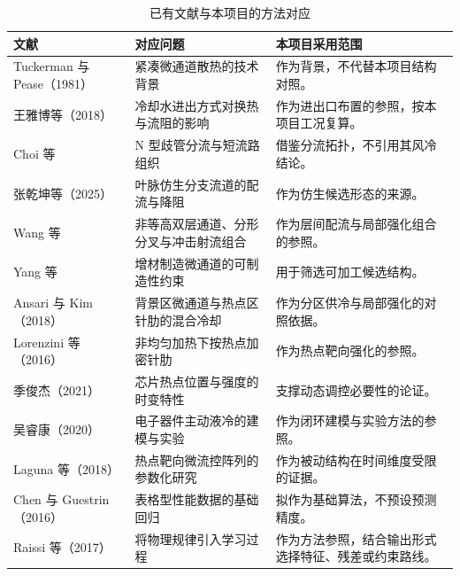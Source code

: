 \documentclass[UTF8]{midterm}
\begin{document}
\clearpage
\setcounter{section}{2}
\setcounter{table}{0}
\begin{table}[!htbp]\centering\small
\caption{已有文献与本项目的方法对应}\label{tab:reading}
\begin{tabularx}{\linewidth}{@{}Y Y Y@{}}\toprule
{} 文献 & 对应问题 & 本项目采用范围 \\\midrule
Tuckerman 与 Pease（1981）\cite{tuckerman1981} & 紧凑微通道散热的技术背景 & 作为背景，不代替本项目结构对照。\\
王雅博等（2018）\cite{ref16} & 冷却水进出方式对换热与流阻的影响 & 作为进出口布置的参照，按本项目工况复算。\\
Choi 等\cite{ref17} & N 型歧管分流与短流路组织 & 借鉴分流拓扑，不引用其风冷结论。\\
张乾坤等（2025）\cite{ref6} & 叶脉仿生分支流道的配流与降阻 & 作为仿生候选形态的来源。\\
Wang 等\cite{ref5} & 非等高双层通道、分形分叉与冲击射流组合 & 作为层间配流与局部强化组合的参照。\\
Yang 等\cite{ref7} & 增材制造微通道的可制造性约束 & 用于筛选可加工候选结构。\\
Ansari 与 Kim（2018）\cite{ref13} & 背景区微通道与热点区针肋的混合冷却 & 作为分区供冷与局部强化的对照依据。\\
Lorenzini 等（2016）\cite{ref24} & 非均匀加热下按热点加密针肋 & 作为热点靶向强化的参照。\\
季俊杰（2021）\cite{ji} & 芯片热点位置与强度的时变特性 & 支撑动态调控必要性的论证。\\
吴睿康（2020）\cite{wu} & 电子器件主动液冷的建模与实验 & 作为闭环建模与实验方法的参照。\\
Laguna 等（2018）\cite{laguna} & 热点靶向微流控阵列的参数化研究 & 作为被动结构在时间维度受限的证据。\\
Chen 与 Guestrin（2016）\cite{chen2016} & 表格型性能数据的基础回归 & 拟作为基础算法，不预设预测精度。\\
Raissi 等（2017）\cite{raissi2017} & 将物理规律引入学习过程 & 作为方法参照，结合输出形式选择特征、残差或约束路线。\\
\bottomrule\end{tabularx}\end{table}
\clearpage
\setcounter{section}{2}
\setcounter{table}{1}
\end{document}
